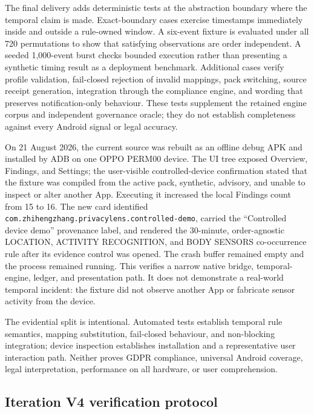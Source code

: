 The final delivery adds deterministic tests at the abstraction boundary where the temporal claim is made. Exact-boundary cases exercise timestamps immediately inside and outside a rule-owned window. A six-event fixture is evaluated under all 720 permutations to show that satisfying observations are order independent. A seeded 1,000-event burst checks bounded execution rather than presenting a synthetic timing result as a deployment benchmark. Additional cases verify profile validation, fail-closed rejection of invalid mappings, pack switching, source receipt generation, integration through the compliance engine, and wording that preserves notification-only behaviour. These tests supplement the retained engine corpus and independent governance oracle; they do not establish completeness against every Android signal or legal accuracy.

On 21 August 2026, the current source was rebuilt as an offline debug APK and installed by ADB on one OPPO PERM00 device. The UI tree exposed Overview, Findings, and Settings; the user-visible controlled-device confirmation stated that the fixture was compiled from the active pack, synthetic, advisory, and unable to inspect or alter another App. Executing it increased the local Findings count from 15 to 16. The new card identified \texttt{com.zhihengzhang.privacylens.controlled-demo}, carried the ``Controlled device demo'' provenance label, and rendered the 30-minute, order-agnostic LOCATION, ACTIVITY RECOGNITION, and BODY SENSORS co-occurrence rule after its evidence control was opened. The crash buffer remained empty and the process remained running. This verifies a narrow native bridge, temporal-engine, ledger, and presentation path. It does not demonstrate a real-world temporal incident: the fixture did not observe another App or fabricate sensor activity from the device.

The evidential split is intentional. Automated tests establish temporal rule semantics, mapping substitution, fail-closed behaviour, and non-blocking integration; device inspection establishes installation and a representative user interaction path. Neither proves GDPR compliance, universal Android coverage, legal interpretation, performance on all hardware, or user comprehension.

\subsection{Iteration V4 verification protocol}

